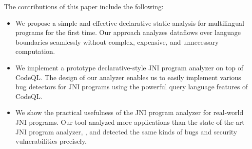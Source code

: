The contributions of this paper include the following:
\begin{itemize}
  \item We propose a simple and effective declarative static analysis for
    multilingual programs for the first time. Our approach analyzes dataflows
    over language boundaries seamlessly without complex, expensive,
    and unnecessary computation.

\item We implement a prototype declarative-style JNI program analyzer on top of CodeQL.
  The design of our analyzer enables us to easily implement various bug
    detectors for JNI programs using the powerful query language
    features of CodeQL. 

\item We show the practical usefulness of the JNI program analyzer for real-world
  JNI programs. Our tool analyzed more applications than the
    state-of-the-art JNI program analyzer, \lees, and detected the same kinds of bugs
    and security vulnerabilities precisely.
\end{itemize}
